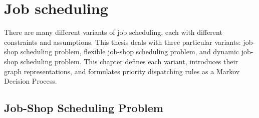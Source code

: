 \chapter{Job scheduling}
\label{chap:refs}

There are many different variants of job scheduling, each with different constraints and assumptions. This thesis deals with three particular variants: job-shop scheduling problem, flexible job-shop scheduling problem, and dynamic job-shop scheduling problem. This chapter defines each variant, introduces their graph representations, and formulates priority dispatching rules as a Markov Decision Process.

\section{Job-Shop Scheduling Problem}

